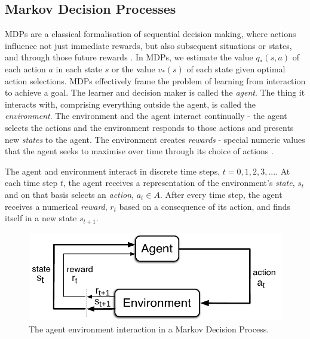 \subsection{Markov Decision Processes}

MDPs are a classical formalisation of sequential decision making, where actions influence not just immediate rewards, but also subsequent situations or states, and through those future rewards \cite{sutton2018reinforcement}. In MDPs, we estimate the value $q_*(s,a)$ of each action $a$ in each state $s$ or the value $v_*(s)$ of each state given optimal action selections. MDPs effectively frame the problem of learning from interaction to achieve a goal. The learner and decision maker is called the \textit{agent}. The thing it interacts with, comprising everything outside the agent, is called the \textit{environment}. The environment and the agent interact continually - the agent selects the actions and the environment responds to those actions and presents new \textit{states} to the agent. The environment creates \textit{rewards} - special numeric values that the agent seeks to maximise over time through its choice of actions \cite{sutton2018reinforcement}. 

The agent and environment interact in discrete time steps, $t = 0,1,2,3, ...$. At each time step $t$, the agent receives a representation of the environment's \textit{state}, $s_t$ and on that basis selects an \textit{action}, $a_t \in A$. After every time step, the agent receives a numerical \textit{reward}, $r_t$ based on a consequence of its action, and finds itself in a new state $s_{t+1}$. 

\begin{figure}[h]
  \centering
  \includegraphics[width=\linewidth]{figures/mdp_ag_env_interaction.png}
  \caption{The agent environment interaction in a Markov Decision Process.}
\end{figure}


